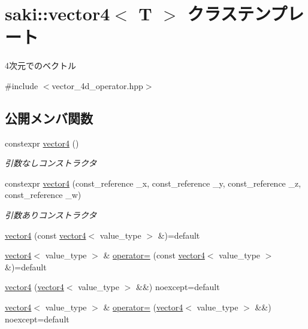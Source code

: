 \hypertarget{classsaki_1_1vector4}{}\section{saki\+:\+:vector4$<$ T $>$ クラステンプレート}
\label{classsaki_1_1vector4}


4次元でのベクトル  




{\ttfamily \#include $<$vector\+\_\+4d\+\_\+operator.\+hpp$>$}

\subsection*{公開メンバ関数}
\begin{DoxyCompactItemize}
\item 
constexpr \mbox{\hyperlink{classsaki_1_1vector4_a79dd4b2f31976d739dd7c6a3a799cd5b}{vector4}} ()
\begin{DoxyCompactList}\small\item\em 引数なしコンストラクタ \end{DoxyCompactList}\item 
constexpr \mbox{\hyperlink{classsaki_1_1vector4_a49fe2f8b17fc93ffb433fcceec620ae0}{vector4}} (const\+\_\+reference \+\_\+x, const\+\_\+reference \+\_\+y, const\+\_\+reference \+\_\+z, const\+\_\+reference \+\_\+w)
\begin{DoxyCompactList}\small\item\em 引数ありコンストラクタ \end{DoxyCompactList}\item 
\mbox{\hyperlink{classsaki_1_1vector4_a48d6b2d19c4bdf4a909d5017e7fb9aaa}{vector4}} (const \mbox{\hyperlink{classsaki_1_1vector4}{vector4}}$<$ value\+\_\+type $>$ \&)=default
\item 
\mbox{\hyperlink{classsaki_1_1vector4}{vector4}}$<$ value\+\_\+type $>$ \& \mbox{\hyperlink{classsaki_1_1vector4_a0fba7bd5e55de03aca8c11a952e7217f}{operator=}} (const \mbox{\hyperlink{classsaki_1_1vector4}{vector4}}$<$ value\+\_\+type $>$ \&)=default
\item 
\mbox{\hyperlink{classsaki_1_1vector4_ab122c461e9e6e775f981d6c197c43fe1}{vector4}} (\mbox{\hyperlink{classsaki_1_1vector4}{vector4}}$<$ value\+\_\+type $>$ \&\&) noexcept=default
\item 
\mbox{\hyperlink{classsaki_1_1vector4}{vector4}}$<$ value\+\_\+type $>$ \& \mbox{\hyperlink{classsaki_1_1vector4_a6e841a2c8d0467586902a4fc0fa6b9a4}{operator=}} (\mbox{\hyperlink{classsaki_1_1vector4}{vector4}}$<$ value\+\_\+type $>$ \&\&) noexcept=default

\end{DoxyCompactItemize}
